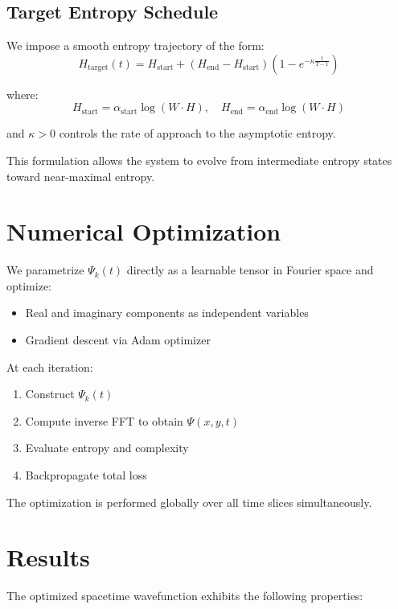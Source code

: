 \documentclass[11pt]{article}
\begin{document}
\subsection{Target Entropy Schedule}

We impose a smooth entropy trajectory of the form:
\[
H_{\text{target}}(t) = H_{\text{start}} + (H_{\text{end}} - H_{\text{start}})\left(1 - e^{-\kappa \frac{t}{T-1}}\right)
\]

where:
\[
H_{\text{start}} = \alpha_{\text{start}} \log(W \cdot H), \quad
H_{\text{end}} = \alpha_{\text{end}} \log(W \cdot H)
\]

and $\kappa > 0$ controls the rate of approach to the asymptotic entropy.

This formulation allows the system to evolve from intermediate entropy states toward near-maximal entropy.



\section{Numerical Optimization}

We parametrize $\Psi_k(t)$ directly as a learnable tensor in Fourier space and optimize:

\begin{itemize}
    \item Real and imaginary components as independent variables
    \item Gradient descent via Adam optimizer
\end{itemize}

At each iteration:
\begin{enumerate}
    \item Construct $\Psi_k(t)$
    \item Compute inverse FFT to obtain $\Psi(x,y,t)$
    \item Evaluate entropy and complexity
    \item Backpropagate total loss
\end{enumerate}

The optimization is performed globally over all time slices simultaneously.



\section{Results}

The optimized spacetime wavefunction exhibits the following properties:
\end{document}
